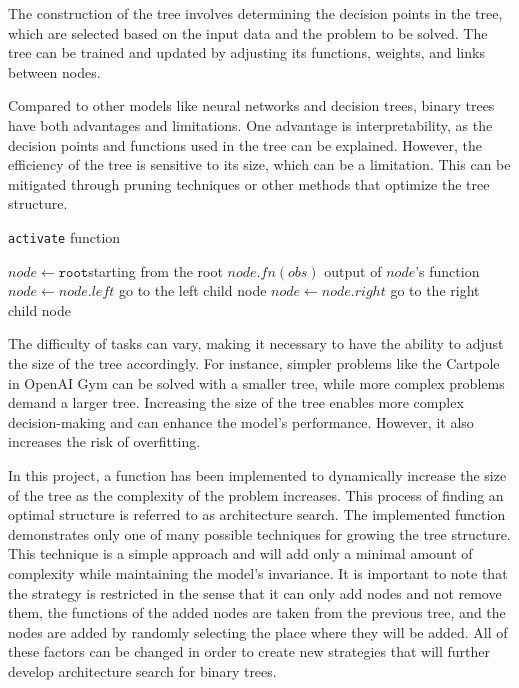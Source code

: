 The construction of the tree involves determining the decision points in the tree, which are selected based on the input data and the problem to be solved. The tree can be trained and updated by adjusting its functions, weights, and links between nodes.

Compared to other models like neural networks and decision trees, binary trees have both advantages and limitations. One advantage is interpretability, as the decision points and functions used in the tree can be explained. However, the efficiency of the tree is sensitive to its size, which can be a limitation. This can be mitigated through pruning techniques or other methods that optimize the tree structure.

\begin{algorithm}
\caption{\texttt{activate} function}
\label{algo:pseudo_activate_function}
\begin{algorithmic}[1]
\State $node \gets \texttt{root}$\Comment starting from the root 
    \Return $node.fn(obs)$ \Comment output of $node$'s function
    \State $node \gets node.left$ \Comment go to the left child node
\Else 
    \State $node \gets node.right$ \Comment go to the right child node
\EndIf
\EndWhile
\EndFunction
\end{algorithmic}
\end{algorithm}

The difficulty of tasks can vary, making it necessary to have the ability to adjust the size of the tree accordingly. For instance, simpler problems like the Cartpole in OpenAI Gym can be solved with a smaller tree, while more complex problems demand a larger tree. Increasing the size of the tree enables more complex decision-making and can enhance the model's performance. However, it also increases the risk of overfitting.

In this project, a function has been implemented to dynamically increase the size of the tree as the complexity of the problem increases. This process of finding an optimal structure is referred to as architecture search. The implemented function demonstrates only one of many possible techniques for growing the tree structure. This technique is a simple approach and will add only a minimal amount of complexity while maintaining the model's invariance. It is important to note that the strategy is restricted in the sense that it can only add nodes and not remove them, the functions of the added nodes are taken from the previous tree, and the nodes are added by randomly selecting the place where they will be added. All of these factors can be changed in order to create new strategies that will further develop architecture search for binary trees.

